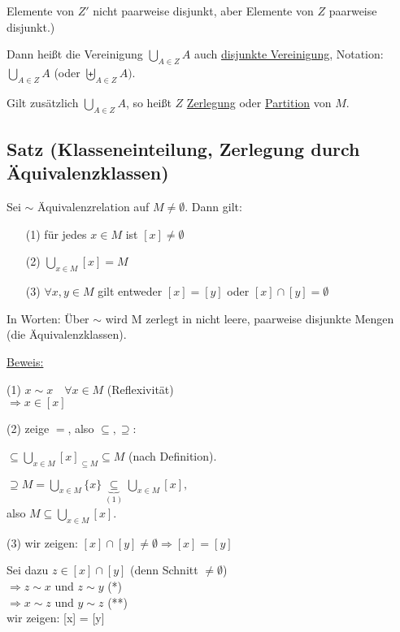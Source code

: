 \documentclass[a4paper, 12pt, twoside] {article}
\begin{document}
Elemente von $Z'$ nicht paarweise disjunkt, aber Elemente von $Z$ paarweise disjunkt.)

Dann heißt die Vereinigung $\displaystyle\bigcup_{A \in Z} A$ auch \underline{disjunkte Vereinigung},
Notation: $\displaystyle\bigcup_{A \in Z} A$ (oder $\displaystyle\biguplus_{A \in Z} A)$.

Gilt zusätzlich $\displaystyle\bigcup_{A \in Z} A$, so heißt $Z$ \underline{Zerlegung} oder \underline{Partition} von $M$.

\subsection{Satz (Klasseneinteilung, Zerlegung durch Äquivalenzklassen)} %
Sei $\sim$ Äquivalenzrelation auf $M \neq \emptyset$. Dann gilt:

\begin{itemize}
\item [(1)] für jedes $x \in M$ ist $[x] \neq \emptyset$
\item [(2)] $\displaystyle\bigcup_{x \in M} [x] = M$
\item [(3)] $\forall x, y \in M$ gilt entweder $[x] = [y]$ oder $[x] \cap [y] = \emptyset$
\end{itemize}

In Worten: Über $\sim$ wird M zerlegt in nicht leere, paarweise disjunkte Mengen (die Äquivalenzklassen).

\underline{Beweis:}

(1) $x \sim x \quad \forall x \in M$ (Reflexivität) \\
$\Rightarrow x \in [x]$

(2) zeige $=$, also $\subseteq, \supseteq$:

$\subseteq \displaystyle\bigcup_{x \in M} [x]_{\subseteq M} \subseteq M$ (nach Definition).

$\supseteq M = \displaystyle\bigcup_{x \in M} \{x\} \underbrace{\subseteq}_{(1)} \displaystyle\bigcup_{x \in M} [x],$ \\
also $M \subseteq \displaystyle\bigcup_{x \in M} [x]$.

(3) wir zeigen: $[x] \cap [y] \neq \emptyset \Rightarrow [x] = [y]$

Sei dazu $z \in [x] \cap [y]$ (denn Schnitt $\neq \emptyset$) \\
$\Rightarrow z \sim x$ und $z \sim y$ (*) \\
$\Rightarrow x \sim z$ und $y \sim z$ (**) \\
wir zeigen: [x] = [y]
\end{document}
